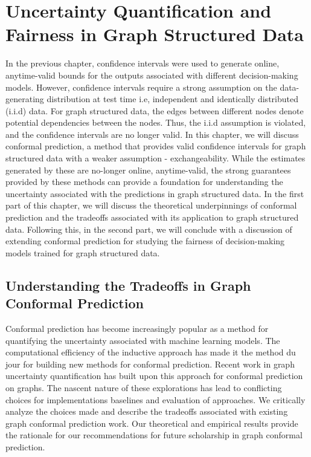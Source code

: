 \chapter{Uncertainty Quantification and Fairness in Graph Structured Data}
In the previous chapter, confidence intervals were used to generate online, anytime-valid bounds for the outputs associated with different decision-making models.
However, confidence intervals require a strong assumption on the data-generating distribution at test time i.e, independent and identically distributed (i.i.d) data.
For graph structured data, the edges between different nodes denote potential dependencies between the nodes.
Thus, the i.i.d assumption is violated, and the confidence intervals are no longer valid.
In this chapter, we will discuss conformal prediction, a method that provides valid confidence intervals for graph structured data with a weaker assumption - exchangeability.
While the estimates generated by these are no-longer online, anytime-valid, the strong guarantees provided by these methods can provide a foundation for understanding the uncertainty associated with the predictions in graph structured data.
In the first part of this chapter, we will discuss the theoretical underpinnings of conformal prediction and the tradeoffs associated with its application to graph structured data.
Following this, in the second part, we will conclude with a discussion of extending conformal prediction for studying the fairness of decision-making models trained for graph structured data.

\section{Understanding the Tradeoffs in Graph Conformal Prediction}

Conformal prediction has become increasingly popular as a method for quantifying the uncertainty associated with machine learning models. 
The computational efficiency of the inductive approach has made it the method du jour for building new methods for conformal prediction.
Recent work in graph uncertainty quantification has built upon this approach for conformal prediction on graphs.
The nascent nature of these explorations has lead to conflicting choices for implementations baselines and evaluation of approaches.
We critically analyze the choices made and describe the tradeoffs associated with existing graph conformal prediction work. 
Our theoretical and empirical results provide the rationale for our recommendations for future scholarship in graph conformal prediction.

